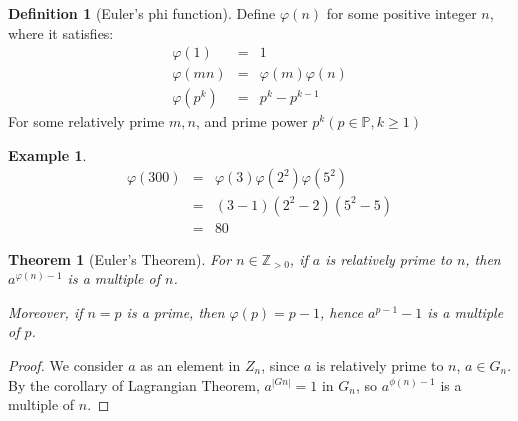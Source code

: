 \documentclass{article}
\theoremstyle{MyNonumberplain}
\theoremstyle{break}
\newtheorem*{proof}{Proof. }
\theoremstyle{break}
\newtheorem{theorem}{Theorem}[section]
\newtheorem{example}{Example}[section]
\theoremstyle{break}
\theoremstyle{definition}
\theoremstyle{break}
\newtheorem{definition}{Definition}[section]
\begin{document}
\begin{defbox}
    \begin{definition}[Euler's phi function]
        Define $\varphi (n)$ for some positive integer $n$, where it satisfies:
        \begin{eqnarray*}
          \varphi (1) & = & 1\\
          \varphi (m n) & = & \varphi (m) \varphi (n)\\
          \varphi (p^k) & = & p^k - p^{k - 1}
        \end{eqnarray*}
        For some relatively prime $m, n$, and prime power $p^k  (p \in \mathbb{P}, k
        \geq 1)$
    \end{definition}
\end{defbox}

\begin{expbox}
    \begin{example}
        \begin{eqnarray*}
            \varphi (300) & = & \varphi (3) \varphi (2^2) \varphi (5^2)\\
                          & = & (3 - 1) (2^2 - 2) (5^2 - 5)\\
                          & = & 80
          \end{eqnarray*}
    \end{example}
\end{expbox}

\begin{thmbox}
    \begin{theorem}[Euler's Theorem]
        For $n \in \mathbb{Z}_{> 0}$, if $a$ is relatively prime to $n$, then
        $a^{\varphi (n) - 1}$ is a multiple of $n$.\bigskip
        
        Moreover, if $n = p$ is a prime, then $\varphi (p) = p - 1$, hence $a^{p - 1} -
        1$ is a multiple of $p$.

    \end{theorem}
    \begin{prfbox}
        \begin{proof}
            We consider $a$ as an element in $Z_n$, since $a$ is relatively prime to $n$, $a \in G_n$. By the corollary
            of Lagrangian Theorem, $a^{|Gn|} = 1$ in $G_n$, so $a^{\phi(n)-1}$ is a multiple of $n$.
        \end{proof}
    \end{prfbox}
\end{thmbox}

\newpage
\end{document}
